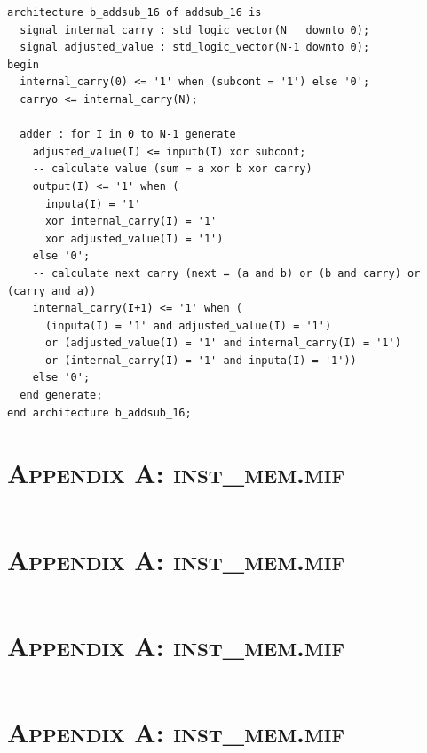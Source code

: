 \documentclass[11pt]{report}
\begin{document}
\begin{spacing}{1.5}
\begin{lstlisting}
architecture b_addsub_16 of addsub_16 is
  signal internal_carry : std_logic_vector(N   downto 0);
  signal adjusted_value : std_logic_vector(N-1 downto 0);
begin
  internal_carry(0) <= '1' when (subcont = '1') else '0';
  carryo <= internal_carry(N);

  adder : for I in 0 to N-1 generate
    adjusted_value(I) <= inputb(I) xor subcont;
    -- calculate value (sum = a xor b xor carry)
    output(I) <= '1' when (
      inputa(I) = '1'
      xor internal_carry(I) = '1'
      xor adjusted_value(I) = '1')
    else '0';
    -- calculate next carry (next = (a and b) or (b and carry) or (carry and a))
    internal_carry(I+1) <= '1' when (
      (inputa(I) = '1' and adjusted_value(I) = '1')
      or (adjusted_value(I) = '1' and internal_carry(I) = '1')
      or (internal_carry(I) = '1' and inputa(I) = '1'))
    else '0';
  end generate;
end architecture b_addsub_16;

\end{lstlisting}

\chapter*{\scshape Appendix A: inst\_mem.mif}
\label{app:a}
\vspace{15px}
\begin{lstlisting}

\end{lstlisting}

\chapter*{\scshape Appendix A: inst\_mem.mif}
\label{app:a}
\vspace{15px}
\begin{lstlisting}

\end{lstlisting}

\chapter*{\scshape Appendix A: inst\_mem.mif}
\label{app:a}
\vspace{15px}
\begin{lstlisting}

\end{lstlisting}

\chapter*{\scshape Appendix A: inst\_mem.mif}
\label{app:a}
\vspace{15px}
\begin{lstlisting}


\end{lstlisting}
\end{spacing}
\end{document}

